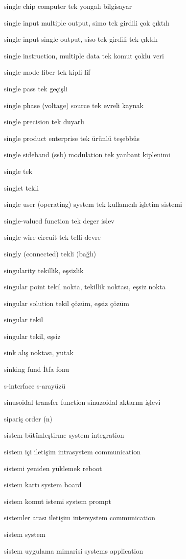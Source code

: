 \documentclass[12pt,fleqn]{article}\usepackage{../../common}
\begin{document}
single chip computer tek yongalı bilgisayar

single input multiple output, simo tek girdili çok çıktılı

single input single output, siso tek girdili tek çıktılı

single instruction, multiple data tek komut çoklu veri

single mode fiber tek kipli lif

single pass tek geçişli

single phase (voltage) source tek evreli kaynak

single precision tek duyarlı

single product enterprise tek ürünlü teşebbüs

single sideband (ssb) modulation tek yanbant kiplenimi

single tek

singlet tekli

single user (operating) system tek kullanıcılı işletim sistemi

single-valued function tek deger islev

single wire circuit tek telli devre

singly (connected) tekli (bağlı)

singularity tekillik, eşsizlik

singular point tekil nokta, tekillik noktası,  eşsiz nokta

singular solution tekil çözüm, eşsiz çözüm

singular tekil

singular tekil, eşsiz

sink alış noktası, yutak

sinking fund İtfa fonu

s-interface s-arayüzü

sinusoidal transfer function sinuzoidal aktarım işlevi

sipariş order (n)

sistem bütünleştirme system integration

sistem içi iletişim intrasystem communication

sistemi yeniden yüklemek reboot

sistem kartı system board

sistem komut istemi system prompt

sistemler arası iletişim intersystem communication

sistem system

sistem uygulama mimarisi systems application
\end{document}
